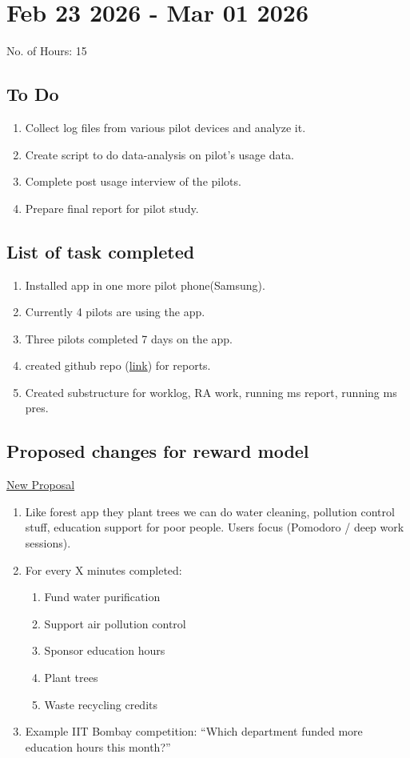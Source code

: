 \documentclass[12pt]{article}
\begin{document}
\section{Feb 23 2026 - Mar 01 2026}
{No. of Hours: 15}
\subsection{To Do}
\begin{enumerate}
    \item Collect log files from various pilot devices and analyze it.
    \item Create script to do data-analysis on pilot's usage data.
    \item Complete post usage interview of the pilots.
     \item Prepare final report  for pilot study.
\end{enumerate}
\subsection{List of task completed}
\begin{enumerate}
    \item Installed app in one more pilot phone(Samsung).
    \item Currently 4 pilots are using the app.
    \item Three pilots completed 7 days on the app.
    \item created github repo (\href{https://github.com/hariom575/MS_Work_logs.git}{link}) for reports.
    \item Created substructure for worklog, RA work, running ms report, running ms pres.
\end{enumerate}
\subsection{Proposed changes for reward model}\href{run:new_proposal.tex}{New Proposal}
\begin{enumerate}
    \item Like forest app they plant trees we can do water cleaning, pollution control stuff, education support for poor people.
    Users focus (Pomodoro / deep work sessions).
    \item For every X minutes completed:
    \begin{enumerate}
\item Fund water purification
 \item Support air pollution control
 \item Sponsor education hours
 \item Plant trees
 \item Waste recycling credits
    \end{enumerate}
   \item  Example IIT Bombay competition:
“Which department funded more education hours this month?”

\end{enumerate}
\end{document}
